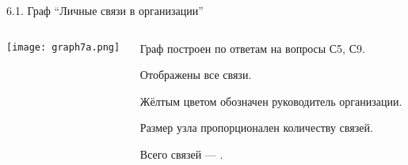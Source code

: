 \begin{frame}{6.1. Граф ``Личные связи в организации''}

\begin{columns}
\begin{column}{0.75\textwidth} 
\centering
          \texttt{[image: graph7a.png]}
\end{column}
\begin{column}{0.25\textwidth}
\tiny
Граф построен по ответам на вопросы С5, С9.
\smallskip

Отображены все связи. 
\smallskip

Жёлтым цветом обозначен руководитель организации.
\smallskip

Размер узла пропорционален количеству связей.
\bigskip

Всего связей --- \valGAlinks.

\end{column}
\end{columns}
\end{frame}


